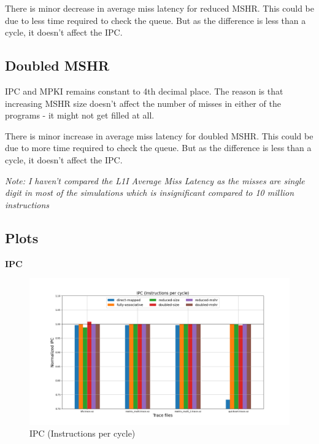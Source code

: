 \documentclass[11pt, swedish, openany]{book}
\begin{document}
There is minor decrease in average miss latency for reduced MSHR. This could be due to less time required to check the queue. But as the difference is less than a cycle, it doesn't affect the IPC.

\subsection{Doubled MSHR}
IPC and MPKI remains constant to 4th decimal place. The reason is that increasing MSHR size doesn't affect the number of misses in either of the programs - it might not get filled at all.

There is minor increase in average miss latency for doubled MSHR. This could be due to more time required to check the queue. But as the difference is less than a cycle, it doesn't affect the IPC.

\vfill*{}

\textit{Note: I haven't compared the L1I Average Miss Latency as the misses are single digit in most of the simulations which is insignificant compared to 10 million instructions}

\newpage
\subsection{Plots}
\textbf{IPC}
\begin{figure}[H]
    \centering
    \includegraphics[scale=0.35]{champsim/speedup.png}
    \caption{IPC (Instructions per cycle)}
\end{figure}
\end{document}
